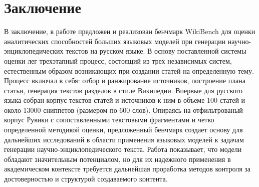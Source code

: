 \documentclass{article}
\theoremstyle{definition}
\theoremstyle{plain}
\begin{document}
\section*{Заключение}
В заключение, в работе предложен и реализован бенчмарк WikiBench для оценки аналитических способностей больших языковых моделей при генерации научно-энциклопедических текстов на русском языке.
В основу поставленной системы оценки лег трехэтапный процесс, состоящий из трех независимых систем, естественным образом возникающих при создании статей на определенную тему.
Процесс включал в себя: отбор и ранжирование источников, построение плана статьи, генерация текстов разделов в стиле Википедии.
Впервые для русского языка собран корпус текстов статей и источников к ним в объеме 100 статей и около 13000 сниппетов (размером по 600 слов). Опираясь на отфильтрованый корпус Рувики с сопоставленными текстовыми фрагментами и четко определенной методикой оценки, 
предложенный бенчмарк создает основу для дальнейших исследований в области применения языковых моделей к задачам генерации научно-энциклопедического текста. Работа показывает, что модели обладают значительным потенциалом, 
но для их надежного применения в академическом контексте требуется дальнейшая проработка методов контроля за достоверностью и структурой создаваемого контента.
\end{document}
